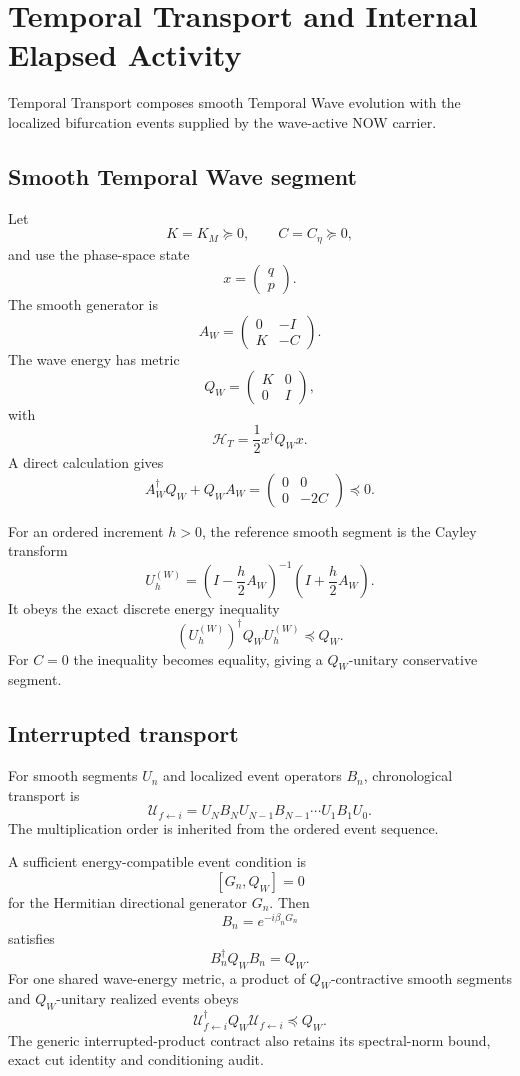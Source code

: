 \chapter{Temporal Transport and Internal Elapsed Activity}

Temporal Transport composes smooth Temporal Wave evolution with the localized bifurcation events supplied by the wave-active NOW carrier.

\section{Smooth Temporal Wave segment}

Let
\[
K=K_M\succeq0,
\qquad
C=C_\eta\succeq0,
\]
and use the phase-space state
\[
x=\begin{pmatrix}q\\p\end{pmatrix}.
\]
The smooth generator is
\[
\boxed{
A_W=
\begin{pmatrix}
0&-I\\
K&-C
\end{pmatrix}.
}
\]
The wave energy has metric
\[
\boxed{
Q_W=
\begin{pmatrix}
K&0\\
0&I
\end{pmatrix},
}
\]
with
\[
\mathcal H_T=\frac12x^\dagger Q_Wx.
\]
A direct calculation gives
\[
\boxed{
A_W^\dagger Q_W+Q_WA_W
=
\begin{pmatrix}
0&0\\
0&-2C
\end{pmatrix}\preceq0.
}
\]

For an ordered increment $h>0$, the reference smooth segment is the Cayley transform
\[
\boxed{
U_h^{(W)}
=\left(I-\frac h2A_W\right)^{-1}
\left(I+\frac h2A_W\right).
}
\]
It obeys the exact discrete energy inequality
\[
\boxed{
(U_h^{(W)})^\dagger Q_WU_h^{(W)}\preceq Q_W.
}
\]
For $C=0$ the inequality becomes equality, giving a $Q_W$-unitary conservative segment.

\section{Interrupted transport}

For smooth segments $U_n$ and localized event operators $B_n$, chronological transport is
\[
\boxed{
\mathcal U_{f\leftarrow i}
=U_NB_NU_{N-1}B_{N-1}\cdots U_1B_1U_0.
}
\]
The multiplication order is inherited from the ordered event sequence.

A sufficient energy-compatible event condition is
\[
[G_n,Q_W]=0
\]
for the Hermitian directional generator $G_n$.  Then
\[
B_n=e^{-i\beta_nG_n}
\]
satisfies
\[
B_n^\dagger Q_WB_n=Q_W.
\]
For one shared wave-energy metric, a product of $Q_W$-contractive smooth segments and $Q_W$-unitary realized events obeys
\[
\boxed{
\mathcal U_{f\leftarrow i}^\dagger
Q_W
\mathcal U_{f\leftarrow i}
\preceq Q_W.
}
\]
The generic interrupted-product contract also retains its spectral-norm bound, exact cut identity and conditioning audit.

